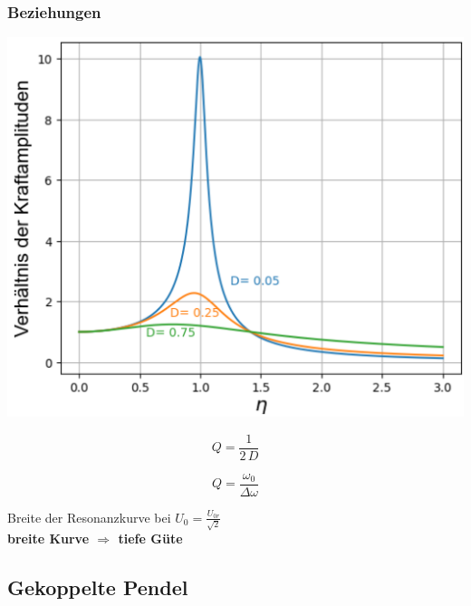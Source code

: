 \subsubsection{Beziehungen}

\begin{minipage}{0.4\linewidth}
\includegraphics[width=0.95\linewidth]{Bilder/Wellen-Optik/guete_resonanz} 
\end{minipage}
\hfill
\begin{minipage}{0.58\linewidth}

\begin{minipage}{0.48\linewidth}
$$ \boxed{Q = \frac{1}{2 \, D} } $$ 
\end{minipage}
\hfill
\begin{minipage}{0.48\linewidth}
$$ \boxed{ Q = \frac{\omega_0}{\Delta \omega} } $$
\end{minipage}

\vspace{0.2cm}

Breite der Resonanzkurve bei $U_0 = \frac{U_{0r}}{\sqrt{2}}$ \\


\textbf{breite Kurve $\Rightarrow$ tiefe Güte}
\end{minipage}



\subsection{Gekoppelte Pendel}

